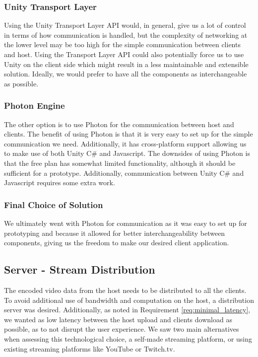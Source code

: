 \subsubsection{Unity Transport Layer}
Using the Unity Transport Layer API would, in general, give us a lot of control in terms of how communication is handled, but the complexity of networking at the lower level may be too high for the simple communication between clients and host. Using the Transport Layer API could also potentially force us to use Unity on the client side which might result in a less maintainable and extensible solution. Ideally, we would prefer to have all the components as interchangeable as possible. 
      
\subsubsection{Photon Engine}
The other option is to use Photon for the communication between host and clients. The benefit of using Photon is that it is very easy to set up for the simple communication we need. Additionally, it has cross-platform support allowing us to make use of both Unity C\# and Javascript. The downsides of using Photon is that the free plan has somewhat limited functionality, although it should be sufficient for a prototype. Additionally, communication between Unity C\# and Javascript requires some extra work\cite{photon_javascript}.

\subsubsection{Final Choice of Solution}
We ultimately went with Photon for communication as it was easy to set up for prototyping and because it allowed for better interchangeability between components, giving us the freedom to make our desired client application.

\subsection{Server - Stream Distribution}
The encoded video data from the host needs to be distributed to all the clients. To avoid additional use of bandwidth and computation on the host, a distribution server was desired. Additionally, as noted in Requirement \ref{req:minimal_latency}, we wanted as low latency between the host upload and clients download as possible, as to not disrupt the user experience. We saw two main alternatives when assessing this technological choice, a self-made streaming platform, or using existing streaming platforms like YouTube or Twitch.tv.

